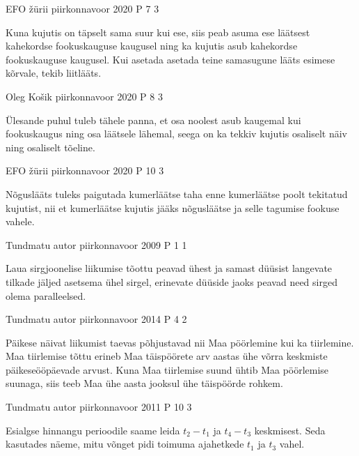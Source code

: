 \documentclass[11pt]{article}
\begin{document}
{%
{EFO žürii} %
{piirkonnavoor} %
{2020} %
{P 7} %
{3} %
{

\ifHint
Kuna kujutis on täpselt sama suur kui ese, siis peab asuma ese läätsest kahekordse fookuskauguse kaugusel ning ka kujutis asub kahekordse fookuskauguse kaugusel. Kui asetada asetada teine samasugune lääts esimese kõrvale, tekib liitlääts.
\fi
}

{Oleg Košik} %
{piirkonnavoor} %
{2020} %
{P 8} %
{3} %
{

\ifHint
Ülesande puhul tuleb tähele panna, et osa noolest asub kaugemal kui fookuskaugus ning osa läätsele lähemal, seega on ka tekkiv kujutis osaliselt näiv ning osaliselt tõeline.
\fi
}


{EFO žürii} %
{piirkonnavoor} %
{2020} %
{P 10} %
{3} %
{

\ifHint
Nõguslääts tuleks paigutada kumerläätse taha enne kumerläätse poolt tekitatud kujutist, nii et kumerläätse kujutis jääks nõgusläätse ja selle tagumise fookuse vahele.
\fi
}


{Tundmatu autor} %
{piirkonnavoor} %
{2009} %
{P 1} %
{1} %
{

\ifHint
Laua sirgjoonelise liikumise tõottu peavad ühest ja samast düüsist langevate tilkade jäljed asetsema ühel sirgel, erinevate düüside jaoks peavad need sirged olema paralleelsed.
\fi
}

{Tundmatu autor} %
{piirkonnavoor} %
{2014} %
{P 4} %
{2} %
{

\ifHint
Päikese näivat liikumist taevas põhjustavad nii Maa pöörlemine kui ka tiirlemine. Maa tiirlemise tõttu erineb Maa täispöörete arv aastas ühe võrra keskmiste päikeseööpäevade arvust. Kuna Maa tiirlemise suund ühtib Maa pöörlemise suunaga, siis teeb Maa ühe aasta jooksul ühe täispöörde rohkem.
\fi
}

{Tundmatu autor} %
{piirkonnavoor} %
{2011} %
{P 10} %
{3} %
{

\ifHint
Esialgse hinnangu perioodile saame leida $t_2 - t_1$ ja $t_4 - t_3$ keskmisest. Seda kasutades näeme, mitu võnget pidi toimuma ajahetkede $t_1$ ja $t_3$ vahel.
\fi
}

}
\end{document}
